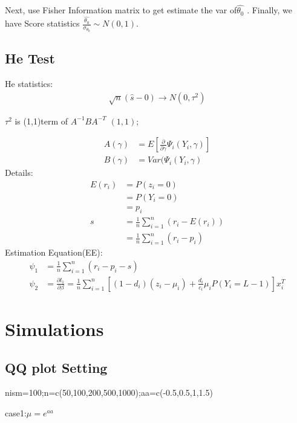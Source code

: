 \documentclass[11pt]{article}
\numberwithin{equation}{section}
\begin{document}
Next, use Fisher Information matrix to get estimate the var of$\hat{\theta_0}$ . Finally, we have Score statistics $ \frac{\hat{\theta_0}}{\sigma_{\theta_0}}\sim N(0,1)$.


\subsection{He Test}  \label{sec3-4}
He statistics:
\begin{align}
             \sqrt{n} \left( \hat{s} - 0 \right) \to N(0,\tau^2) 
\end{align}

 $\tau^2$ is (1,1)term of $A^{-1}BA^{-T}$  $(1,1)$;
 
 \begin{align}
 A(\gamma)&= E\left[ \frac{\partial}{\partial\gamma}\Psi_i( Y_i ,\gamma) \right] \\
  B(\gamma)&=Var(\Psi_i( Y_i ,\gamma)  
\end{align}
Details:
\begin{align}
E(r_i)&=P(z_i=0) \nonumber\\
&=P(Y_i=0) \nonumber\\
&=p_i  \\
s &=\frac{1}{n}\sum_{i=1}^n\left(r_i-E(r_i)\right)\nonumber\\
&=\frac{1}{n}\sum_{i=1}^n(r_i-p_i)
\end{align}
Estimation Equation(EE):
\begin{align}
            \psi _{1}&=\frac{1}{n}\sum_{i=1}^{n}\left( r_{i}-p_{i}-s\right)  \\
            \psi_{2}&=\frac{\partial{l_1}}{\partial{\beta}}=\frac{1}{n}\sum_{i=1}^{n}\left[(1-d_i)(z_i-\mu_i)+\frac{d_i}{c_i}\mu_iP(Y_i=L-1)\right] x_i^T  
\end{align}



\section{Simulations}  \label{sec3-4}

\subsection{QQ plot Setting}
nism=100;n=c(50,100,200,500,1000);aa=c(-0.5,0.5,1,1.5)

case1:$\mu=e^{aa}$
\end{document}
